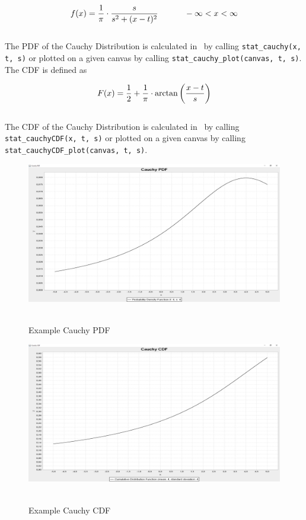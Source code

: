 		$$\displaystyle f(x) = \frac{1}{\pi} \cdot \frac{s}{s^2 + (x-t)^2} \quad \hspace{.3in} -\infty<x<\infty$$
		\\[0.3cm]
		The \ac{PDF} of the Cauchy Distribution is calculated in \setlx\ by calling \lstinline{stat_cauchy(x, t, s)} or plotted on a given canvas by calling \lstinline{stat_cauchy_plot(canvas, t, s)}.
		\\[0.3cm]
		The \ac{CDF} is defined as 

		$$\displaystyle F(x) = \frac{1}{2} + \frac{1}{\pi} \cdot \arctan\left(\frac{x-t}{s}\right)$$
		\\[0.3cm]
		The \ac{CDF} of the Cauchy Distribution is calculated in \setlx\ by calling \lstinline{stat_cauchyCDF(x, t, s)} or plotted on a given canvas by calling \lstinline{stat_cauchyCDF_plot(canvas, t, s)}.

		\begin{figure}[H]
			\centering
			\includegraphics[width=1\textwidth]{Figures/implemented_functions/cauchy_pdf}~\\
			\caption{Example Cauchy PDF}
			\label{fig:cauchy_pdf}
		\end{figure}


		\begin{figure}[H]
			\centering
			\includegraphics[width=1\textwidth]{Figures/implemented_functions/cauchy_cdf}~\\
			\caption{Example Cauchy CDF}
			\label{fig:cauchy_cdf}
		\end{figure}


